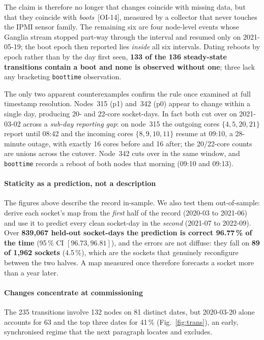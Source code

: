\documentclass[10pt,conference]{IEEEtran}
\begin{document}
The claim is therefore no longer that changes coincide with missing data, but that they coincide
with \emph{boots}~[OI-14], measured by a collector that never touches the IPMI sensor family. The
remaining six are four node-level events whose Ganglia stream stopped part-way through the interval
and resumed only on 2021-05-19; the boot epoch then reported lies \emph{inside} all six intervals.
Dating reboots by epoch rather than by the day first seen, \textbf{133 of the 136 steady-state
transitions contain a boot and none is observed without one}; three lack any bracketing
\texttt{boottime} observation.

The only two apparent counterexamples confirm the rule once examined at full timestamp resolution.
Nodes~315 (p1) and~342 (p0) appear to change within a single day, producing 20- and 22-core
socket-days. In fact both cut over on 2021-03-02 across a \emph{sub-day reporting
gap}: on node~315 the outgoing cores $\{4,5,20,21\}$ report until 08:42 and the incoming cores
$\{8,9,10,11\}$ resume at 09:10, a 28-minute outage, with exactly 16 cores before and 16 after; the
20/22-core counts are unions across the cutover. Node~342 cuts over in the same window, and
\texttt{boottime} records a reboot of both nodes that morning (09:10 and 09:13).

\paragraph*{Staticity as a prediction, not a description} The figures above describe the record
in-sample. We also test them out-of-sample: derive each socket's map from the \emph{first} half of
the record (2020-03 to 2021-06) and use it to predict every clean socket-day in the \emph{second}
(2021-07 to 2022-09). Over \textbf{839{,}067 held-out socket-days the prediction is correct
96.77\,\% of the time} (95\,\% CI $[96.73,96.81]$), and the errors are not diffuse: they fall on \textbf{89 of 1{,}962
sockets} (4.5\,\%), which are the sockets that genuinely reconfigure between the two halves. A map
measured once therefore forecasts a socket more than a year later.

\paragraph*{Changes concentrate at commissioning} The 235 transitions involve 132 nodes on 81
distinct dates, but 2020-03-20 alone accounts for 63 and the top three dates for 41\,\%
(Fig.~\ref{fig:trans}), an early, synchronised regime that the next paragraph locates and excludes.
\end{document}

